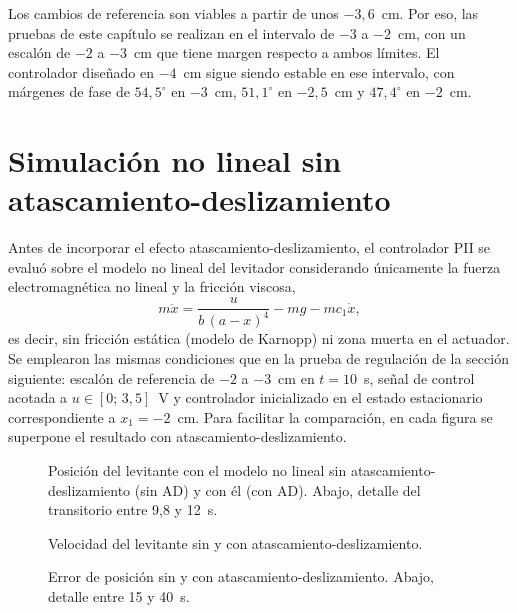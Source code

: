 Los cambios de referencia son viables a partir de unos $-3{,}6$~cm. Por eso, las pruebas de este capítulo se realizan en el intervalo de $-3$ a $-2$~cm, con un escalón de $-2$ a $-3$~cm que tiene margen respecto a ambos límites. El controlador diseñado en $-4$~cm sigue siendo estable en ese intervalo, con márgenes de fase de $54{,}5^\circ$ en $-3$~cm, $51{,}1^\circ$ en $-2{,}5$~cm y $47{,}4^\circ$ en $-2$~cm.

\section{Simulación no lineal sin atascamiento-deslizamiento}

Antes de incorporar el efecto atascamiento-deslizamiento, el controlador PII se evaluó sobre el modelo no lineal del levitador considerando únicamente la fuerza electromagnética no lineal y la fricción viscosa,
\begin{equation}
m\ddot{x} = \frac{u}{b\,(a-x)^4} - m g - m c_1 \dot{x} ,
\label{eq:nl_sin_ad}
\end{equation}
es decir, sin fricción estática (modelo de Karnopp) ni zona muerta en el actuador. Se emplearon las mismas condiciones que en la prueba de regulación de la sección siguiente: escalón de referencia de $-2$ a $-3$~cm en $t=10$~s, señal de control acotada a $u\in[0;\,3{,}5]$~V y controlador inicializado en el estado estacionario correspondiente a $x_1=-2$~cm. Para facilitar la comparación, en cada figura se superpone el resultado con atascamiento-deslizamiento.

\begin{figure}[ht]
    \centering
    
    \caption[Sin AD: posición]{Posición del levitante con el modelo no lineal sin atascamiento-deslizamiento (sin AD) y con él (con AD). Abajo, detalle del transitorio entre 9,8 y 12~s.}
    \label{fig:sinad_pos}
\end{figure}

\begin{figure}[ht]
    \centering
    
    \caption[Sin AD: velocidad]{Velocidad del levitante sin y con atascamiento-deslizamiento.}
    \label{fig:sinad_vel}
\end{figure}

\begin{figure}[ht]
    \centering
    
    \caption[Sin AD: error]{Error de posición sin y con atascamiento-deslizamiento. Abajo, detalle entre 15 y 40~s.}
    \label{fig:sinad_error}
\end{figure}

